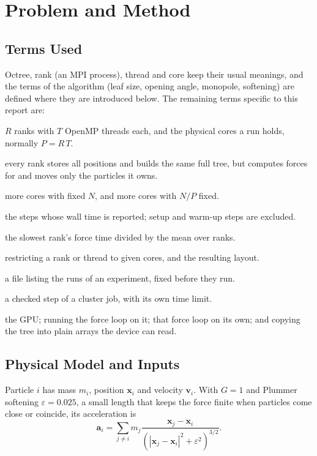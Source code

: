 \documentclass[10pt,a4paper,twocolumn,twoside]{rho-class/rho}
\begin{document}
\section{Problem and Method}
\label{sec:method}
\subsection{Terms Used}
Octree, rank (an MPI process), thread and core keep their usual meanings, and the terms of the algorithm (leaf size, opening angle, monopole, softening) are defined where they are introduced below. The remaining terms specific to this report are:
\begin{description}[noitemsep,leftmargin=0pt,font=\normalfont\itshape]
\item[$R \times T$, $P$:] $R$ ranks with $T$ OpenMP threads each, and the physical cores a run holds, normally $P = R\,T$.
\item[Replicated tree, owned particles:] every rank stores all positions and builds the same full tree, but computes forces for and moves only the particles it owns.
\item[Strong and weak scaling:] more cores with fixed $N$, and more cores with $N/P$ fixed.
\item[Timed region:] the steps whose wall time is reported; setup and warm-up steps are excluded.
\item[Traversal imbalance:] the slowest rank's force time divided by the mean over ranks.
\item[Binding, placement:] restricting a rank or thread to given cores, and the resulting layout.
\item[Manifest:] a file listing the runs of an experiment, fixed before they run.
\item[Gate:] a checked step of a cluster job, with its own time limit.
\item[Device, offload, kernel, flattening:] the GPU; running the force loop on it; that force loop on its own; and copying the tree into plain arrays the device can read.
\end{description}

\subsection{Physical Model and Inputs}
Particle $i$ has mass $m_i$, position $\mathbf{x}_i$ and velocity $\mathbf{v}_i$. With $G=1$ and Plummer softening $\varepsilon = 0.025$, a small length that keeps the force finite when particles come close or coincide, its acceleration is
\begin{equation}
\mathbf{a}_i = \sum_{j \ne i} m_j \frac{\mathbf{x}_j - \mathbf{x}_i}{\left(|\mathbf{x}_j - \mathbf{x}_i|^2 + \varepsilon^2\right)^{3/2}}.
\label{eq:force}
\end{equation}
\end{document}
